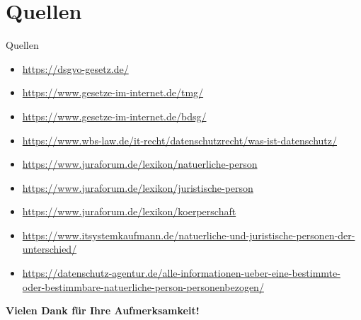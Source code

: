 \documentclass[9pt]{beamer}
\begin{document}
    \section{Quellen}
        \begin{frame}{Quellen}{}
            \begin{itemize}
                \item \href{https://dsgvo-gesetz.de/}{https://dsgvo-gesetz.de/}
                \item \href{https://www.gesetze-im-internet.de/tmg/}{https://www.gesetze-im-internet.de/tmg/}
                \item \href{https://www.gesetze-im-internet.de/bdsg/}{https://www.gesetze-im-internet.de/bdsg/}
                \item \href{https://www.wbs-law.de/it-recht/datenschutzrecht/was-ist-datenschutz/}{https://www.wbs-law.de/it-recht/datenschutzrecht/was-ist-datenschutz/}
                \item \href{https://www.juraforum.de/lexikon/natuerliche-person}{https://www.juraforum.de/lexikon/natuerliche-person}
                \item \href{https://www.juraforum.de/lexikon/juristische-person}{https://www.juraforum.de/lexikon/juristische-person}
                \item \href{https://www.juraforum.de/lexikon/koerperschafthttps://www.juraforum.de/lexikon/koerperschaft}{https://www.juraforum.de/lexikon/koerperschaft}
                \item \href{https://www.itsystemkaufmann.de/natuerliche-und-juristische-personen-der-unterschied/}{https://www.itsystemkaufmann.de/natuerliche-und-juristische-personen-der-unterschied/}
                \item \href{https://datenschutz-agentur.de/alle-informationen-ueber-eine-bestimmte-oder-bestimmbare-natuerliche-person-personenbezogen/}{https://datenschutz-agentur.de/alle-informationen-ueber-eine-bestimmte-oder-bestimmbare-natuerliche-person-personenbezogen/}
            \end{itemize}
        \end{frame}


        \begin{frame}[plain]
            \begin{center}
                \huge\textbf{Vielen Dank für Ihre Aufmerksamkeit!}
            \end{center}
        \end{frame}
    
\end{document}
